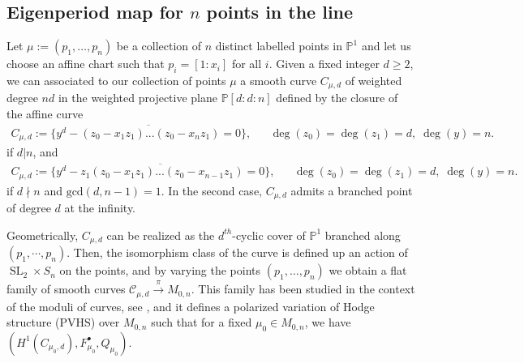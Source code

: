 \documentclass[12pt, letterpaper]{amsart}
\theoremstyle{plain}
\theoremstyle{definition}
\DeclareMathOperator{\SL}{SL}
\begin{document}
\subsection{Eigenperiod map for $n$ points in the line}
\label{sec:hodgetheoryBackground}
Let $\mu := (p_1, \ldots, p_n)$ be a collection of $n$ distinct labelled points in $\mathbb{P}^1$ and let us choose an affine chart such that $p_i= [1:x_i]$ for all $i$. Given a fixed integer $d \geq 2$, we can associated to our collection of points $\mu$ a smooth curve 
$C_{\mu,d}$ of weighted degree $nd$ in the weighted projective plane $\mathbb{P}[d:d:n]$  defined by the closure of the affine curve
\begin{align}\label{eq:CurveFromPoints}
    C_{\mu,d}:= 
    \overline{\{ y^d-(z_0-x_1z_1)...(z_0-x_nz_1) =0\}},
    & &
\deg(z_0) = \deg(z_1) = d, \; \deg(y)=n.
\end{align}
if $d|n$, and 
\begin{align}\label{eq:CurveFromPoints2}
    C_{\mu,d}:= 
    \overline{\{ y^d-z_1(z_0-x_1z_1)...(z_0-x_{n-1}z_1) =0\}},
    & &
\deg(z_0) = \deg(z_1) = d, \; \deg(y)=n.
\end{align}
if $d\nmid n$ and $\mathrm{gcd}(d,n-1)=1$. In the second case, $C_{\mu,d}$ admits a branched point of degree $d$ at the infinity. 

Geometrically, $C_{\mu,d}$ can be realized as the $d^{th}$-cyclic cover of $\mathbb{P}^1$ branched along  $(p_1, \cdots, p_n )$. Then, 
the isomorphism class of the curve is defined up an action of $\SL_2 \times S_n$ on the points, and  by varying the points
$(p_1, \ldots, p_n)$ we obtain a flat family of smooth curves $\mathcal{C}_{\mu, d}\xrightarrow{\pi} M_{0,n}$.
This family has been studied in the context of the moduli of curves, see \cite{fedorchuk2011cyclic}, and it defines a polarized variation of Hodge structure (PVHS) over $M_{0,n}$ such that for a fixed $\mu_0 \in M_{0,n}$, we have 
$\left( H^{1}(C_{\mu_0,d}), F^{\bullet}_{\mu_0}, Q_{\mu_0} \right)$.
\end{document}
